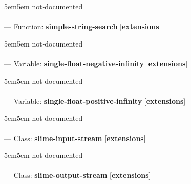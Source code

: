 \begin{adjustwidth}{5em}{5em}
not-documented
\end{adjustwidth}

\paragraph{}
\label{EXTENSIONS:SIMPLE-STRING-SEARCH}
--- Function: \textbf{simple-string-search} [\textbf{extensions}] \textit{}

\begin{adjustwidth}{5em}{5em}
not-documented
\end{adjustwidth}

\paragraph{}
\label{EXTENSIONS:SINGLE-FLOAT-NEGATIVE-INFINITY}
--- Variable: \textbf{single-float-negative-infinity} [\textbf{extensions}] \textit{}

\begin{adjustwidth}{5em}{5em}
not-documented
\end{adjustwidth}

\paragraph{}
\label{EXTENSIONS:SINGLE-FLOAT-POSITIVE-INFINITY}
--- Variable: \textbf{single-float-positive-infinity} [\textbf{extensions}] \textit{}

\begin{adjustwidth}{5em}{5em}
not-documented
\end{adjustwidth}

\paragraph{}
\label{EXTENSIONS:SLIME-INPUT-STREAM}
--- Class: \textbf{slime-input-stream} [\textbf{extensions}] \textit{}

\begin{adjustwidth}{5em}{5em}
not-documented
\end{adjustwidth}

\paragraph{}
\label{EXTENSIONS:SLIME-OUTPUT-STREAM}
--- Class: \textbf{slime-output-stream} [\textbf{extensions}] \textit{}

